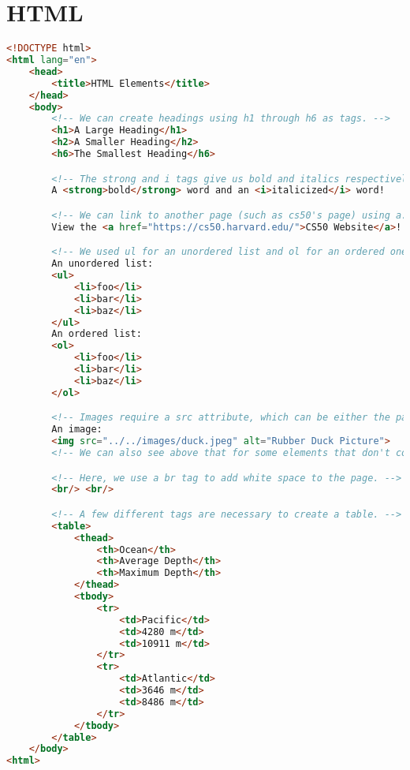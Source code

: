 \documentclass[a4paper]{article}
\begin{document}
\section{HTML}
\begin{tcolorbox}[title= \centering Example code, colback= VSblack, width =150mm]
\centering
	\begin{lstlisting}[language = HTML]
<!DOCTYPE html>
<html lang="en">
    <head>
        <title>HTML Elements</title>
    </head>
    <body>
        <!-- We can create headings using h1 through h6 as tags. -->
        <h1>A Large Heading</h1>
        <h2>A Smaller Heading</h2>
        <h6>The Smallest Heading</h6>

        <!-- The strong and i tags give us bold and italics respectively. -->
        A <strong>bold</strong> word and an <i>italicized</i> word!

        <!-- We can link to another page (such as cs50's page) using a. -->
        View the <a href="https://cs50.harvard.edu/">CS50 Website</a>!

        <!-- We used ul for an unordered list and ol for an ordered one. both ordered and unordered lists contain li, or list items. -->
        An unordered list:
        <ul>
            <li>foo</li>
            <li>bar</li>
            <li>baz</li>
        </ul>
        An ordered list:
        <ol>
            <li>foo</li>
            <li>bar</li>
            <li>baz</li>
        </ol>

        <!-- Images require a src attribute, which can be either the path to a file on your computer or the link to an image online. It also includes an alt attribute, which gives a description in case the image can't be loaded. -->
        An image:
        <img src="../../images/duck.jpeg" alt="Rubber Duck Picture">
        <!-- We can also see above that for some elements that don't contain other ones, closing tags are not necessary. -->

        <!-- Here, we use a br tag to add white space to the page. -->
        <br/> <br/>

        <!-- A few different tags are necessary to create a table. -->
        <table>
            <thead>
                <th>Ocean</th>
                <th>Average Depth</th>
                <th>Maximum Depth</th>
            </thead>
            <tbody>
                <tr>
                    <td>Pacific</td>
                    <td>4280 m</td>
                    <td>10911 m</td>
                </tr>
                <tr>
                    <td>Atlantic</td>
                    <td>3646 m</td>
                    <td>8486 m</td>
                </tr>
            </tbody>
        </table>
    </body>
<html>	
\end{lstlisting}
\end{tcolorbox}
%
\end{document}
